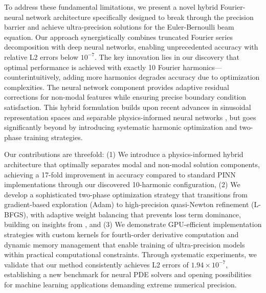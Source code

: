 To address these fundamental limitations, we present a novel hybrid Fourier-neural network architecture specifically designed to break through the precision barrier and achieve ultra-precision solutions for the Euler-Bernoulli beam equation. Our approach synergistically combines truncated Fourier series decomposition with deep neural networks, enabling unprecedented accuracy with relative L2 errors below $10^{-7}$. The key innovation lies in our discovery that optimal performance is achieved with exactly 10 Fourier harmonics—counterintuitively, adding more harmonics degrades accuracy due to optimization complexities. The neural network component provides adaptive residual corrections for non-modal features while ensuring precise boundary condition satisfaction. This hybrid formulation builds upon recent advances in sinusoidal representation spaces \cite{wong2022learning} and separable physics-informed neural networks \cite{cho2023separable}, but goes significantly beyond by introducing systematic harmonic optimization and two-phase training strategies.

Our contributions are threefold: (1) We introduce a physics-informed hybrid architecture that optimally separates modal and non-modal solution components, achieving a 17-fold improvement in accuracy compared to standard PINN implementations through our discovered 10-harmonic configuration, (2) We develop a sophisticated two-phase optimization strategy that transitions from gradient-based exploration (Adam) to high-precision quasi-Newton refinement (L-BFGS), with adaptive weight balancing that prevents loss term dominance, building on insights from \cite{penwarden2023unified}, and (3) We demonstrate GPU-efficient implementation strategies with custom kernels for fourth-order derivative computation and dynamic memory management that enable training of ultra-precision models within practical computational constraints. Through systematic experiments, we validate that our method consistently achieves L2 errors of $1.94 \times 10^{-7}$, establishing a new benchmark for neural PDE solvers and opening possibilities for machine learning applications demanding extreme numerical precision.

